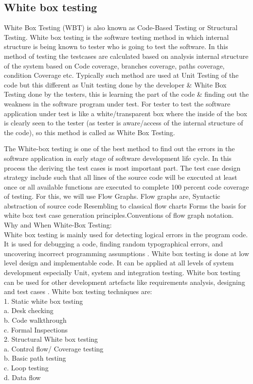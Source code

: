 \documentclass[10pt,a4paper]{article}
\begin{document}
\subsection{White box testing}
		 White Box Testing (WBT) is also known as Code-Based Testing or Structural Testing. White box testing is the software testing method in which internal structure is being known to tester who is going to test the software. In this method of testing the testcases are calculated based on analysis internal structure of the system based on Code coverage, branches coverage, paths coverage, condition Coverage etc. Typically such method are used at Unit Testing of the code but this different as Unit testing done by the developer \& White Box Testing done by the testers, this is learning the part of the code \& finding out the weakness in the software program under test.
For tester to test the software application under test is like a white/transparent box where the inside of the box is clearly seen to the tester (as tester is aware/access of the internal structure of the code), so this method is called as White Box Testing.

The White-box testing is one of the best method to find out the errors in the software application in early stage of software development life cycle. In this process the deriving the test cases is most important part. The test case design strategy include such that all lines of the source code will be executed at least once or all available functions are executed to complete 100 percent  code coverage of testing. For this, we will use Flow Graphs. Flow graphs are, Syntactic abstraction of source code Resembling to classical flow charts Forms the basis for white box test case generation principles.Conventions of flow graph notation. \\
Why and When White-Box Testing:\\
White box testing is mainly used for detecting logical errors in the program code. It is used for
debugging a code, finding random typographical errors, and uncovering incorrect programming
assumptions .
White box testing is done at low level design and implementable code. It can be applied at all levels of
system development especially Unit, system and integration testing. White box testing can be used for
other development artefacts like requirements analysis, designing and test cases .
White box testing techniques are:\\
1. Static white box testing\\
a. Desk checking\\
b. Code walkthrough\\
c. Formal Inspections\\
2. Structural White box testing\\
a. Control flow/ Coverage testing\\
b. Basic path testing\\
c. Loop testing\\
d. Data flow \\
\end{document}
